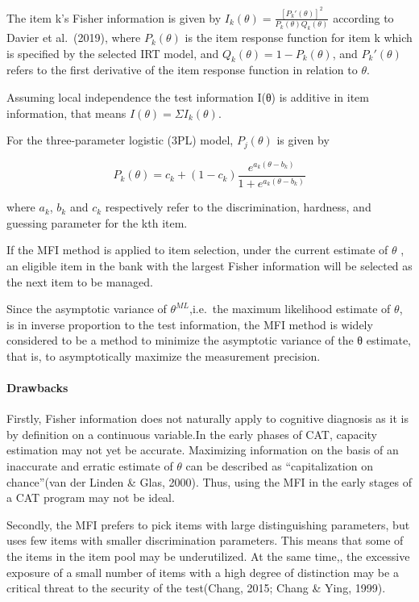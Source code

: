 \documentclass[
]{article}
\begin{document}
The item k's Fisher information is given by
\(I_k(\theta)=\frac {[P_k'(\theta)]^2}{P_k(\theta)Q_k(\theta)}\)
according to Davier et al.~(2019), where \(P_k(\theta)\) is the item
response function for item k which is specified by the selected IRT
model, and \(Q_k(θ) = 1 − P_k(θ)\), and \(P_k' (θ)\) refers to the first
derivative of the item response function in relation to \(\theta\).

Assuming local independence the test information I(θ) is additive in
item information, that means \(I(\theta)=\Sigma I_k(\theta)\).

For the three-parameter logistic (3PL) model, \(P_j(θ)\) is given by

\[P_k(\theta)=c_k+(1-c_k)\frac{e^{a_k(\theta-b_k)}}{1+e^{a_k(\theta-b_k)}}\]

where \(a_k\), \(b_k\) and \(c_k\) respectively refer to the
discrimination, hardness, and guessing parameter for the kth item.

If the MFI method is applied to item selection, under the current
estimate of \(\theta\) , an eligible item in the bank with the largest
Fisher information will be selected as the next item to be managed.

Since the asymptotic variance of \(\theta ^{ML}\),i.e.~the maximum
likelihood estimate of \(\theta\), is in inverse proportion to the test
information, the MFI method is widely considered to be a method to
minimize the asymptotic variance of the θ estimate, that is, to
asymptotically maximize the measurement precision.

\hypertarget{drawbacks}{%
\paragraph{Drawbacks}\label{drawbacks}}

Firstly, Fisher information does not naturally apply to cognitive
diagnosis as it is by definition on a continuous variable.In the early
phases of CAT, capacity estimation may not yet be accurate. Maximizing
information on the basis of an inaccurate and erratic estimate of
\(\theta\) can be described as ``capitalization on chance''(van der
Linden \& Glas, 2000). Thus, using the MFI in the early stages of a CAT
program may not be ideal.

Secondly, the MFI prefers to pick items with large distinguishing
parameters, but uses few items with smaller discrimination parameters.
This means that some of the items in the item pool may be underutilized.
At the same time,, the excessive exposure of a small number of items
with a high degree of distinction may be a critical threat to the
security of the test(Chang, 2015; Chang \& Ying, 1999).
\end{document}
